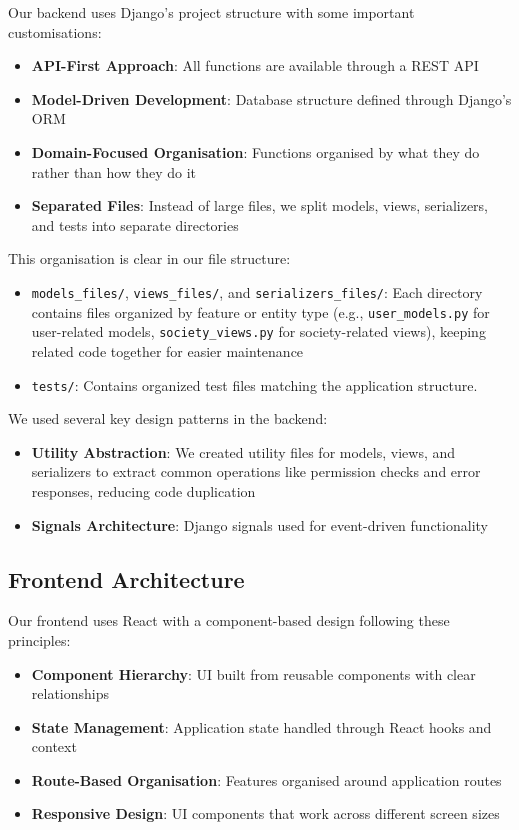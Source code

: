 Our backend uses Django's project structure with some important customisations:

\begin{itemize}
    \item \textbf{API-First Approach}: All functions are available through a REST API
    \item \textbf{Model-Driven Development}: Database structure defined through Django's ORM
    \item \textbf{Domain-Focused Organisation}: Functions organised by what they do rather than how they do it
    \item \textbf{Separated Files}: Instead of large files, we split models, views, serializers, and tests into separate directories
\end{itemize}

This organisation is clear in our file structure:

\begin{itemize}
    \item \texttt{models\_files/}, \texttt{views\_files/}, and \texttt{serializers\_files/}: Each directory contains files organized by feature or entity type (e.g., \texttt{user\_models.py} for user-related models, \texttt{society\_views.py} for society-related views), keeping related code together for easier maintenance
    \item \texttt{tests/}: Contains organized test files matching the application structure.
\end{itemize}


We used several key design patterns in the backend:

\begin{itemize}
    \item \textbf{Utility Abstraction}: We created utility files for models, views, and serializers to extract common operations like permission checks and error responses, reducing code duplication
    \item \textbf{Signals Architecture}: Django signals used for event-driven functionality
\end{itemize}

\subsection{Frontend Architecture}

Our frontend uses React with a component-based design following these principles:

\begin{itemize}
    \item \textbf{Component Hierarchy}: UI built from reusable components with clear relationships
    \item \textbf{State Management}: Application state handled through React hooks and context
    \item \textbf{Route-Based Organisation}: Features organised around application routes
    \item \textbf{Responsive Design}: UI components that work across different screen sizes
\end{itemize}


